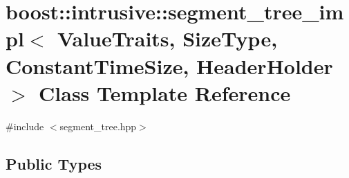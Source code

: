\hypertarget{classboost_1_1intrusive_1_1segment__tree__impl}{}\section{boost\+:\+:intrusive\+:\+:segment\+\_\+tree\+\_\+impl$<$ Value\+Traits, Size\+Type, Constant\+Time\+Size, Header\+Holder $>$ Class Template Reference}
\label{classboost_1_1intrusive_1_1segment__tree__impl}


{\ttfamily \#include $<$segment\+\_\+tree.\+hpp$>$}

\subsection*{Public Types}
